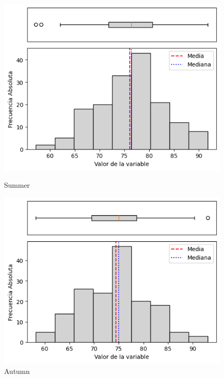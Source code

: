 \begin{figure}[H]
\centering
\begin{minipage}{0.30\textwidth}
  \includegraphics[width=\linewidth]{resultados/por_estacion_del_anio/boxplot_clases_por_estacion/Ancachuro/RH_HistBoxplot_Summer.png}
  \caption*{Summer}
\end{minipage}
\hfill
\begin{minipage}{0.30\textwidth}
  \includegraphics[width=\linewidth]{resultados/por_estacion_del_anio/boxplot_clases_por_estacion/Ancachuro/RH_HistBoxplot_Autumn.png}
  \caption*{Autumn}
\end{minipage}

\vspace{0.2cm}


\end{figure}

